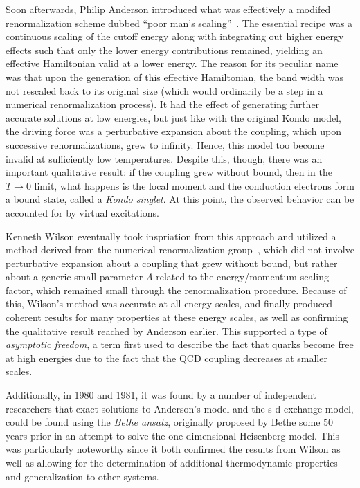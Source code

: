 Soon afterwards, Philip Anderson introduced what was effectively a modifed renormalization scheme dubbed ``poor man's scaling''~\cite{Anderson_1970}. The essential recipe was a continuous scaling of the cutoff energy along with integrating out higher energy effects such that only the lower energy contributions remained, yielding an effective Hamiltonian valid at a lower energy. The reason for its peculiar name was that upon the generation of this effective Hamiltonian, the band width was not rescaled back to its original size (which would ordinarily be a step in a numerical renormalization process). It had the effect of generating further accurate solutions at low energies, but just like with the original Kondo model, the driving force was a perturbative expansion about the coupling, which upon successive renormalizations, grew to infinity. Hence, this model too become invalid at sufficiently low temperatures. Despite this, though, there was an important qualitative result: if the coupling grew without bound, then in the $T \rightarrow 0$ limit, what happens is the local moment and the conduction electrons form a bound state, called a \textit{Kondo singlet}. At this point, the observed behavior can be accounted for by virtual excitations.

Kenneth Wilson eventually took inspriation from this approach and utilized a method derived from the numerical renormalization group~\cite{Wilson_1975}, which did not involve perturbative expansion about a coupling that grew without bound, but rather about a generic small parameter $\Lambda$ related to the energy/momentum scaling factor, which remained small through the renormalization procedure. Because of this, Wilson's method was accurate at all energy scales, and finally produced coherent results for many properties at these energy scales, as well as confirming the qualitative result reached by Anderson earlier. This supported a type of \textit{asymptotic freedom}, a term first used to describe the fact that quarks become free at high energies due to the fact that the QCD coupling decreases at smaller scales.

Additionally, in 1980 and 1981, it was found by a number of independent researchers that exact solutions to Anderson's model and the s-d exchange model, could be found using the \textit{Bethe ansatz}, originally proposed by Bethe some 50 years prior in an attempt to solve the one-dimensional Heisenberg model. This was particularly noteworthy since it both confirmed the results from Wilson as well as allowing for the determination of additional thermodynamic properties and generalization to other systems.


